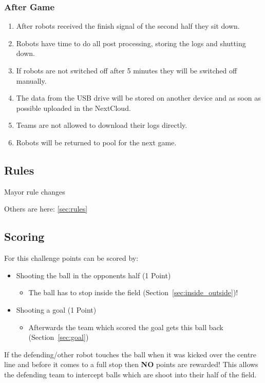 \subsubsection{After Game}
	
	\begin{enumerate}
		\item After robots received the finish signal of the second half they sit down.
		\item Robots have time to do all post processing, storing the logs and shutting down.
		\item If robots are not switched off after 5 minutes they will be switched off manually.
		\item The data from the USB drive will be stored on another device and as soon as possible uploaded in the NextCloud.
		\item Teams are not allowed to download their logs directly.
		\item Robots will be returned to pool for the next game.
	\end{enumerate}


\subsection{Rules}
Mayor rule changes 

Others are here: \ref{sec:rules}

\subsection{Scoring}
\label{sec:scoring}

For this challenge points can be scored by:
\begin{itemize}
	\item Shooting the ball in the opponents half (1 Point)
	\begin{itemize}
		\item The ball has to stop inside the field (\cf Section~\ref{sec:inside_outside})!
	\end{itemize} 
	\item Shooting a goal (1 Point)
	\begin{itemize}
		\item Afterwards the team which scored the goal gets this ball back (\cf Section~\ref{sec:goal})
	\end{itemize}
\end{itemize}

If the defending/other robot touches the ball when it was kicked over the centre line and before it comes to a full stop then \textbf{NO} points are rewarded! This allows the defending team to intercept balls which are shoot into their half of the field.

